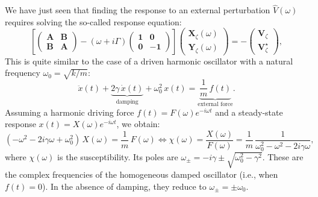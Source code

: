 \documentclass[10pt,aspectratio=169]{beamer}
\begin{document}
\begin{frame}
	We have just seen that finding the response to an external perturbation $\hat V(\omega)$ requires solving the so-called response equation:
	\begin{equation*}
		\left[
		\begin{pmatrix}
			\mathbf{A} & \mathbf{B} \\
			\mathbf{B} & \mathbf{A}
		\end{pmatrix}
		- (\omega+i\Gamma)
		\begin{pmatrix}
			\mathbf{1} & \mathbf{0} \\
			\mathbf{0} & -\mathbf{1}
		\end{pmatrix}
		\right]
		\begin{pmatrix}
			\mathbf{X}_\zeta(\omega) \\
			\mathbf{Y}_\zeta(\omega)
		\end{pmatrix}
		=
		-\begin{pmatrix}
			\mathbf{V}_\zeta \\
			\mathbf{V}_\zeta^\star
		\end{pmatrix},
		\label{eq:response}
	\end{equation*}
	This is quite similar to the case of a driven harmonic oscillator with a natural frequency $\omega_0=\sqrt{k/m}$:
	\begin{equation*}
		\ddot{x}(t) + \underbrace{2\gamma\,\dot{x}(t)}_{\text{damping}} + \omega_0^2\,x(t) = \underbrace{\frac{1}{m}\,f(t)}_{\text{external force}}.
	\end{equation*}
	\pause
	Assuming a harmonic driving force $f(t) = F(\omega)e^{-i\omega t}$ and a steady-state response $x(t)=X(\omega)e^{-i\omega t}$, we obtain:
	\begin{equation*}
		(-\omega^2-2i\gamma\omega+\omega_0^2)\,X(\omega) = \frac{1}{m}\,F(\omega) \Leftrightarrow \chi(\omega) = \frac{X(\omega)}{F(\omega)} = \frac{1}{m}\,\frac{1}{\omega_0^2-\omega^2-2i\gamma\omega},
	\end{equation*}
	where $\chi(\omega)$ is the susceptibility.
	Its poles are $\omega_{\pm} = -i\gamma \pm \sqrt{\omega_0^2-\gamma^2}$. These are the complex frequencies of the homogeneous damped oscillator (i.e., when $f(t)=0$). In the absence of damping, they reduce to $\omega_{\pm}=\pm\omega_0$.
\end{frame}
\end{document}

